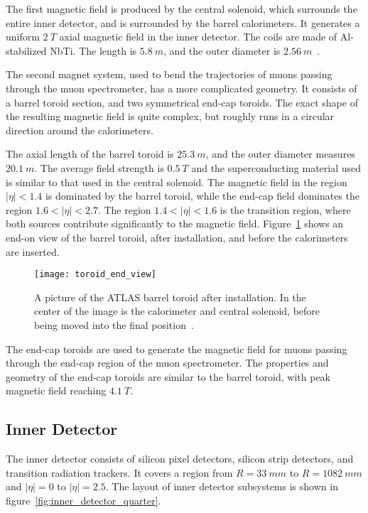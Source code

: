 The first magnetic field is produced by the central solenoid, which surrounds the entire inner detector,
and is surrounded by the barrel calorimeters.
It generates a uniform $2~T$ axial magnetic field in the inner detector.
The coils are made of Al-stabilized NbTi. The length is $5.8~m$, and the outer diameter is $2.56~m$~\cite{atlas-detector-2008}.

The second magnet system, used to bend the trajectories of muons passing through the muon spectrometer,
has a more complicated geometry.
It consists of a barrel toroid section, and two symmetrical end-cap toroids.
The exact shape of the resulting magnetic field is quite complex,
but roughly runs in a circular direction around the calorimeters.

The axial length of the barrel toroid is $25.3~m$, and the outer diameter measures $20.1~m$.
The average field strength is $0.5~T$ and the superconducting material used is similar to that used in the
central solenoid\cite{atlas-detector-2008}.
The magnetic field in the region $|\eta|<1.4$ is dominated by the barrel toroid,
while the end-cap field dominates the region $1.6 < |\eta| < 2.7$.
The region $1.4 < |\eta| < 1.6$ is the transition region, where both sources contribute significantly to the magnetic field.
Figure~\ref{fig:toroid_end_view} shows an end-on view of the barrel toroid, after installation, and before the calorimeters are inserted.

\begin{figure}[!ht]\centering
\texttt{[image: toroid\_end\_view]}
\caption{A picture of the ATLAS barrel toroid after installation.
In the center of the image is the calorimeter and central solenoid, before being moved into the final position~\cite{atlas-detector-2008}.}
\label{fig:toroid_end_view}
\end{figure}

The end-cap toroids are used to generate the magnetic field for muons passing through the end-cap region of the muon spectrometer.
The properties and geometry of the end-cap toroids are similar to the barrel toroid,
with peak magnetic field reaching $4.1~T$\cite{atlas-detector-2008}.

\subsection{Inner Detector}\label{subsec:inner_detector}
The inner detector consists of silicon pixel detectors, silicon strip detectors, and transition radiation trackers.
It covers a region from $R = 33~mm$ to $R = 1082~mm$ and $|\eta| = 0$ to $|\eta| = 2.5$.
The layout of inner detector subsystems is shown in figure~\ref{fig:inner_detector_quarter}.

